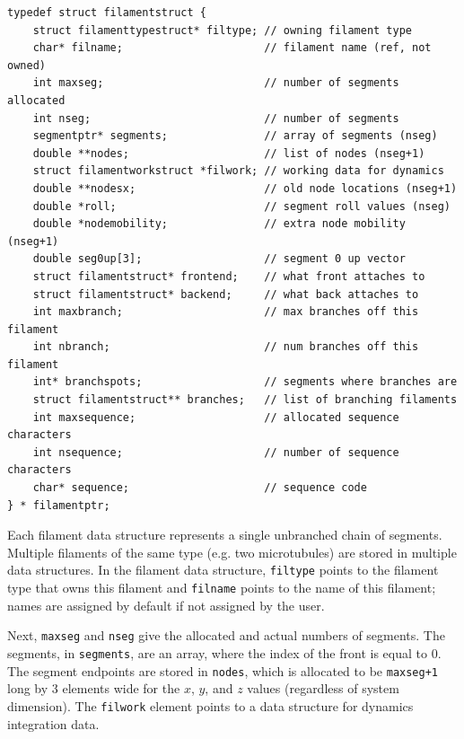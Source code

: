 \documentclass {scrbook}
\newcommand {\ttt} {\texttt}
\begin{document}
\begin{lstlisting}
typedef struct filamentstruct {
    struct filamenttypestruct* filtype; // owning filament type
    char* filname;                      // filament name (ref, not owned)
    int maxseg;                         // number of segments allocated
    int nseg;                           // number of segments
    segmentptr* segments;               // array of segments (nseg)
    double **nodes;                     // list of nodes (nseg+1)
    struct filamentworkstruct *filwork; // working data for dynamics
    double **nodesx;                    // old node locations (nseg+1)
    double *roll;                       // segment roll values (nseg)
    double *nodemobility;               // extra node mobility (nseg+1)
    double seg0up[3];                   // segment 0 up vector
    struct filamentstruct* frontend;    // what front attaches to
    struct filamentstruct* backend;     // what back attaches to
    int maxbranch;                      // max branches off this filament
    int nbranch;                        // num branches off this filament
    int* branchspots;                   // segments where branches are
    struct filamentstruct** branches;   // list of branching filaments
    int maxsequence;                    // allocated sequence characters
    int nsequence;                      // number of sequence characters
    char* sequence;                     // sequence code
} * filamentptr;
\end{lstlisting}

Each filament data structure represents a single unbranched chain of segments. Multiple filaments of the same type (e.g. two microtubules) are stored in multiple data structures. In the filament data structure, \ttt{filtype} points to the filament type that owns this filament and \ttt{filname} points to the name of this filament; names are assigned by default if not assigned by the user.

Next, \ttt{maxseg} and \ttt{nseg} give the allocated and actual numbers of segments. The segments, in \ttt{segments}, are an array, where the index of the front is equal to 0. The segment endpoints are stored in \ttt{nodes}, which is allocated to be \ttt{maxseg+1} long by 3 elements wide for the $x$, $y$, and $z$ values (regardless of system dimension). The \ttt{filwork} element points to a data structure for dynamics integration data.
\end{document}
